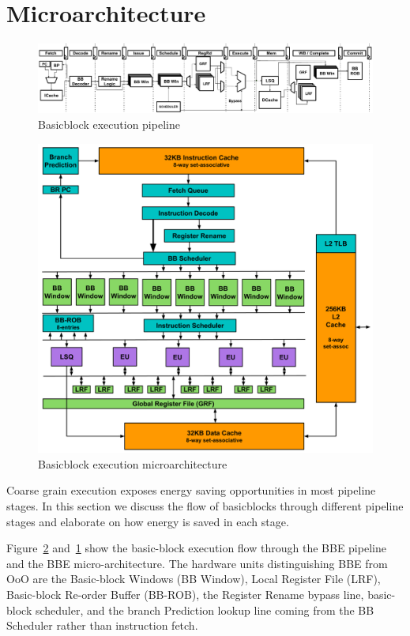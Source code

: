 \section{Microarchitecture}
\label{sec:uarch}

\begin{figure}
	\centering
	\includegraphics[width=\textwidth]{fig/pipeline.pdf} 
	\caption{Basicblock execution pipeline}
	\label{fig:pipeline}
\end{figure}

\begin{figure}
	\centering
	\includegraphics[width=1.0\columnwidth]{fig/bb_architecture.pdf} 
	\caption{Basicblock execution microarchitecture}
	\label{fig:bb_arch}
\end{figure}

Coarse grain execution exposes energy saving opportunities in most pipeline
stages. In this section we discuss the flow of basicblocks through different
pipeline stages and elaborate on how energy is saved in each stage.

Figure~\ref{fig:bb_arch} and~\ref{fig:pipeline} show the basic-block execution
flow through the BBE pipeline and the BBE micro-architecture. The hardware units
distinguishing BBE from OoO are the Basic-block Windows (BB Window), Local Register
File (LRF), Basic-block Re-order Buffer (BB-ROB), the Register Rename bypass
line, basic-block scheduler, and the branch Prediction lookup line coming 
from the BB Scheduler rather than instruction fetch.

